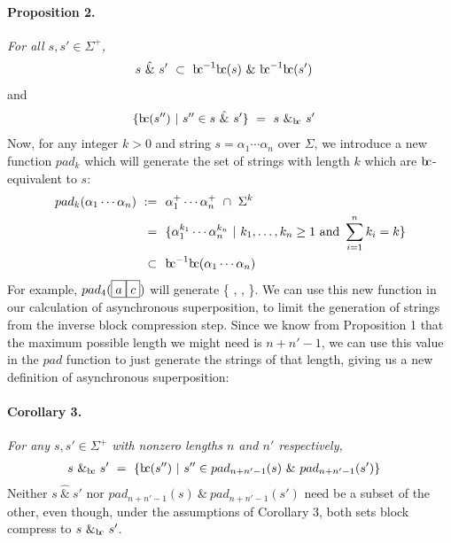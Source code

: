 \documentclass[a4paper,11pt]{article}
\newcommand{\bc}{{\rm b\!c}}
\newcommand{\vph}[1]{\vphantom{#1}}
\newcommand{\rr}{{\rm r}}
\begin{document}
\paragraph{Proposition 2.} {\sl For all $s,s'\in \Sigma^+$,}
\begin{align*}
s\ \hat{\&}\ s' & \ \subset\ \bc^{-1}\bc(s)\ \&\ \bc^{-1}\bc(s')
\end{align*}
and
\begin{align*}
\{\bc(s'')\ | \ s''\in s\ \hat{\&}\ s'\}
& \ = \   s\ \&_{\bc}\ s'
\end{align*}
Now, for any integer $k > 0$ and string $s = \alpha_1\cdots\alpha_n$ over 
$\Sigma$, we introduce a new 
function 
$pad_k$ which will generate the set of strings with length $k$ which are 
$\bc$-equivalent to $s$:
\begin{align*}
pad_k(\alpha_1\cdots\alpha_n)~:=&~~\alpha_1^+\cdots\alpha_n^+\ \cap\ \Sigma^k \\
=&~~\{
\alpha_1^{k_1}\cdots\alpha_n^{k_n}\ | \
k_1,\ldots,k_n\geq 1
\mbox{ and } \sum_{i=1}^n k_i = k \}\\
\subset&~~\bc^{-1}\bc(\alpha_1\cdots\alpha_n)
\end{align*}
For example, $pad_{4}(\fbox{$a\vph{'}$}\fbox{$c\vph{'}$})$ will 
generate \{
\fbox{$a\vph{'}$}\fbox{$a\vph{'}$}\fbox{$a\vph{'}$}\fbox{$c\vph{'}$}, 
\fbox{$a\vph{'}$}\fbox{$a\vph{'}$}\fbox{$c\vph{'}$}\fbox{$c\vph{'}$}, 
\fbox{$a\vph{'}$}\fbox{$c\vph{'}$}\fbox{$c\vph{'}$}\fbox{$c\vph{'}$} \}. We 
can use this new function in our 
calculation of asynchronous superposition, to limit the generation of strings 
from the inverse block compression step. Since we know from Proposition 1 that 
the maximum possible 
length we might need is $n+n'-1$, we can use this value in the $pad$ function 
to just 
generate the strings of that length, giving us a new definition of asynchronous 
superposition:
\paragraph{Corollary 3.} {\sl For any $s,s'\in \Sigma^+$
	with nonzero lengths $n$ and $n'$ respectively,}
\begin{align*}
s \ \&_{\bc} \ s' & \ = \
\{\bc(s'')\ | \ s''\in pad_{n+n'-1}(s)\ \& \ pad_{n+n'-1}(s')\}
\end{align*}
Neither $s\ \hat{\&}\ s'$ nor $pad_{n+n'-1}(s)\ \& \ pad_{n+n'-1}(s')$
need be a subset of the other, even though,
under the assumptions of Corollary 3, 
both sets block compress to $s \ \&_{\bc} \ s'$.
\end{document}
